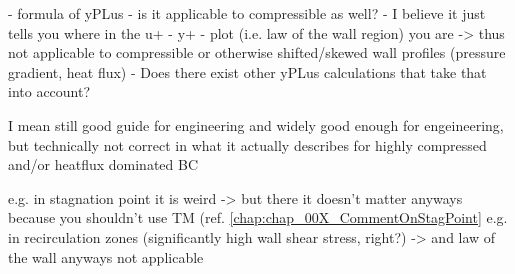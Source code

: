 \label{chap:chap_00X_CommentOnYPlus}
- formula of yPLus
- is it applicable to compressible as well?
    - I believe it just tells you where in the u+ - y+ - plot (i.e. law of the wall region) you are -> thus not applicable to compressible or otherwise shifted/skewed wall profiles (pressure gradient, heat flux)
    - Does there exist other yPLus calculations that take that into account?

I mean still good guide for engineering and widely good enough for engeineering, but technically not correct in what it actually describes for highly compressed and/or heatflux dominated BC

e.g. in stagnation point it is weird -> but there it doesn't matter anyways because you shouldn't use TM (ref. \ref{chap:chap_00X_CommentOnStagPoint}
e.g. in recirculation zones (significantly high wall shear stress, right?) -> and law of the wall anyways not applicable